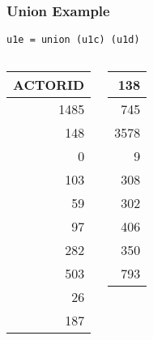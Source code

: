 \documentclass[dvipsnames]{beamer}
\theoremstyle{plain}
\begin{document}
\begin{frame}[fragile]
  \frametitle{Union Example}

  \begin{example}
    \begin{lstlisting}
u1e = union (u1c) (u1d)
    \end{lstlisting}

    \pause
    \begin{columns}[b]
      \begin{tiny}
      \begin{table}
        \begin{tabular}{|r|}\hline
ACTORID\\\hline\hline
   1485\\\hline
    148\\\hline
      0\\\hline
    103\\\hline
     59\\\hline
     97\\\hline
    282\\\hline
    503\\\hline
     26\\\hline
    187\\\hline
      \end{tabular}
      \end{table}
      \end{tiny}

      \begin{tiny}
      \begin{table}
        \begin{tabular}{|r|}\hline
    138\\\hline
    745\\\hline
   3578\\\hline
      9\\\hline
    308\\\hline
    302\\\hline
    406\\\hline
    350\\\hline
    793\\\hline
      \end{tabular}
      \end{table}
      \end{tiny}
    \end{columns}
  \end{example}
\end{frame}
\end{document}
